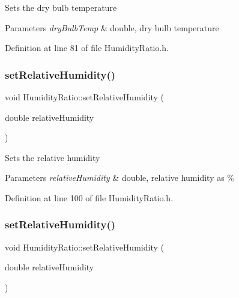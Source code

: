 Sets the dry bulb temperature


\begin{DoxyParams}{Parameters}
{\em dry\+Bulb\+Temp} & double, dry bulb temperature \\
\hline
\end{DoxyParams}


Definition at line 81 of file Humidity\+Ratio.\+h.

\mbox{\label{class_humidity_ratio_a110aecb6587a836ab76d4aca840e5759}} 
\subsubsection{\texorpdfstring{set\+Relative\+Humidity()}{setRelativeHumidity()}\hspace{0.1cm}{\footnotesize\ttfamily [1/3]}}
{\footnotesize\ttfamily void Humidity\+Ratio\+::set\+Relative\+Humidity (\begin{DoxyParamCaption}\item[{double}]{relative\+Humidity }\end{DoxyParamCaption})\hspace{0.3cm}{\ttfamily [inline]}}

Sets the relative humidity


\begin{DoxyParams}{Parameters}
{\em relative\+Humidity} & double, relative humidity as \% \\
\hline
\end{DoxyParams}


Definition at line 100 of file Humidity\+Ratio.\+h.

\mbox{\label{class_humidity_ratio_a110aecb6587a836ab76d4aca840e5759}} 
\subsubsection{\texorpdfstring{set\+Relative\+Humidity()}{setRelativeHumidity()}\hspace{0.1cm}{\footnotesize\ttfamily [2/3]}}
{\footnotesize\ttfamily void Humidity\+Ratio\+::set\+Relative\+Humidity (\begin{DoxyParamCaption}\item[{double}]{relative\+Humidity }\end{DoxyParamCaption})\hspace{0.3cm}{\ttfamily [inline]}}

